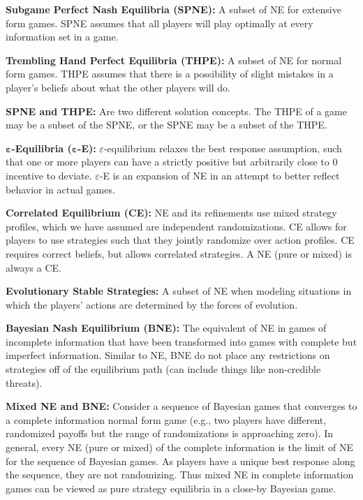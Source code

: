 \documentclass{report}
\begin{document}
\textbf{Subgame Perfect Nash Equilibria (SPNE):} A subset of NE for extensive form games. SPNE assumes that all players will play optimally at every information set in a game.\bigskip \bigskip

\textbf{Trembling Hand Perfect Equilibria (THPE):} A subset of NE for normal form games. THPE assumes that there is a possibility of slight mistakes in a player's beliefs about what the other players will do. \bigskip \bigskip

\textbf{SPNE and THPE:} Are two different solution concepts. The THPE of a game may be a subset of the SPNE, or the SPNE may be a subset of the THPE. \bigskip \bigskip

\textbf{$\boldsymbol{\varepsilon}$-Equilibria ($\boldsymbol{\varepsilon}$-E):} $\varepsilon$-equilibrium relaxes the best response assumption, such that one or more players can have a strictly positive but arbitrarily close to 0 incentive to deviate. $\varepsilon$-E is an expansion of NE in an attempt to better reflect behavior in actual games. \bigskip \bigskip

\textbf{Correlated Equilibrium (CE):} NE and its refinements use mixed strategy profiles, which we have assumed are independent randomizations. CE allows for players to use strategies such that they jointly randomize over action profiles. CE requires correct beliefs, but allows correlated strategies. A NE (pure or mixed) is always a CE.\bigskip \bigskip

\textbf{Evolutionary Stable Strategies:} A subset of NE when modeling situations in which the players' actions are determined by the forces of evolution. \bigskip \bigskip

\textbf{Bayesian Nash Equilibrium (BNE):} The equivalent of NE in games of incomplete information that have been transformed into games with complete but imperfect information. Similar to NE, BNE do not place any restrictions on strategies off of the equilibrium path (can include things like non-credible threats). \bigskip \bigskip

\textbf{Mixed NE and BNE:} Consider a sequence of Bayesian games that converges to a complete information normal form game (e.g., two players have different, randomized payoffs but the range of randomizations is approaching zero). In general, every NE (pure or mixed) of the complete information is the limit of NE for the sequence of Bayesian games. As players have a unique best response along the sequence, they are not randomizing. Thus mixed NE in complete information games can be viewed as pure strategy equilibria in a close-by Bayesian game. \bigskip \bigskip
\end{document}
